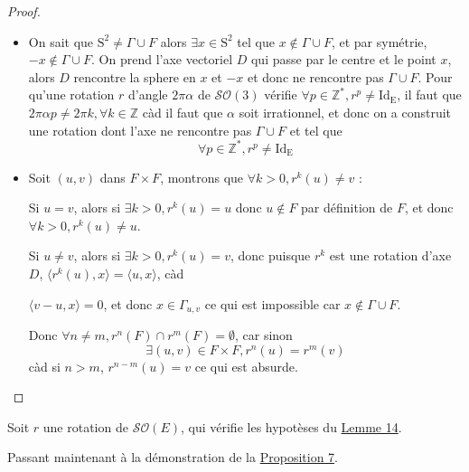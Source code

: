 \begin{proof}
  \hfill
  \begin{itemize}
  \item On sait que $\mathrm{S}^2 \ne \Gamma\cup F$ alors $\exists x \in \mathrm{S}^2$ tel que $x \not \in \Gamma\cup F$, et par symétrie, $-x \not \in \Gamma\cup F$. On prend l'axe vectoriel $D$ qui passe par le centre et le point $x$, alors $D$ rencontre la sphere en $x$ et $-x$ et donc ne rencontre pas $\Gamma\cup F$.
  Pour qu'une rotation $r$ d'angle $2\pi\alpha$ de $\mathcal{SO}(3)$ vérifie
  $\forall p \in \mathbb{Z}^*, r^p \neq \mathrm{Id_E}$, il faut que $2 \pi \alpha p \neq 2 \pi k, \forall k \in \mathbb{Z}$ càd il faut que $\alpha$ soit irrationnel, et donc on a construit une rotation dont l'axe ne rencontre pas $\Gamma \cup F$ et tel que  $$\forall p \in \mathbb{Z}^*, r^p \neq \mathrm{Id_E}$$
  \item Soit $(u, v)$ dans $F \times F$, montrons que $\forall k > 0, r^k(u) \ne v$ :
  \par Si $u=v$, alors si $\exists k > 0, r^k(u)=u$ donc $u \not \in F$ par définition de $F$, et donc $\forall k >0, r^k(u)\neq u$.
  \par Si $u\neq v$, alors si $\exists k > 0, r^k(u)=v$, donc puisque $r^k$ est une rotation d'axe $D$, $\langle r^k(u), x \rangle = \langle u, x \rangle$, càd \par $\langle v-u, x \rangle = 0$, et donc $x \in \Gamma_{u, v}$ ce qui est impossible car $x \not \in \Gamma \cup F$.\par
  Donc $\forall n\neq m, r^n(F)\cap r^m(F) = \emptyset$, car sinon $$\exists (u,v) \in F \times F, r^n(u)=r^m(v)$$ càd si $n>m$, $r^{n-m}(u)=v$ ce qui est absurde.\par
\end{itemize} \end{proof}
\begin{definition}
  Soit $r$ une rotation de $\mathcal{SO}(E)$, qui vérifie les hypotèses du \hyperref[lemme17]{Lemme 14}.
\end{definition}
Passant maintenant à la démonstration de la \hyperref[prop8]{Proposition 7}.
